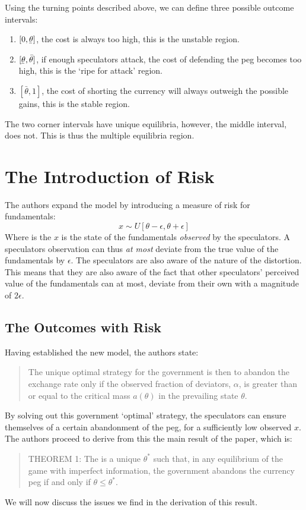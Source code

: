 \begin{refsection}
Using the turning points described above, we can define three possible outcome intervals:
\begin{enumerate}
	\item $[0, \underaccent{\bar}{\theta}]$, the cost is always too high, this is the unstable region.
	\item $[\underaccent{\bar}{\theta}, \bar{\theta}]$, if enough speculators attack, the cost of defending the peg becomes too high,
	this is the `ripe for attack' region.
	\item $[\bar{\theta}, 1]$, the cost of shorting the currency will always outweigh the possible gains,
	this is the stable region.
\end{enumerate}
The two corner intervals have unique equilibria, however, the middle interval, does not. This is thus the multiple equilibria region.


\section{The Introduction of Risk}
The authors expand the model by introducing a measure of risk for fundamentals:
\begin{equation}
x \sim U[\theta - \epsilon, \theta + \epsilon]
\end{equation}
Where is the $x$ is the state of the fundamentals \textit{observed} by the speculators.
A speculators observation can thus \textit{at most} deviate from the true value of the fundamentals by $\epsilon$.
The speculators are also aware of the nature of the distortion.
This means that they are also aware of the fact that other speculators' perceived value of the fundamentals can at most,
deviate from their own with a magnitude of $2\epsilon$.

\subsection{The Outcomes with Risk}
\label{unc:results}
Having established the new model, the authors state:
\begin{quotation}
	The unique optimal strategy for the government is then to abandon the exchange rate only if the observed fraction of deviators, $\alpha$, is greater than or equal to the critical mass $a(\theta)$ in the prevailing state $\theta$.\parencite[p.~591]{morris1998unique}
\end{quotation}
By solving out this government `optimal' strategy,
the speculators can ensure themselves of a certain abandonment of the peg,
for a sufficiently low observed $x$.
The authors proceed to derive from this the main result of the paper, which is:
\begin{quotation}
	THEOREM 1: The is a unique $\theta^*$ such that,
	in any equilibrium of the game with imperfect information,
	the government abandons the currency peg if and only if $\theta \leq \theta^*$. \parencite[p.~592]{morris1998unique}
\end{quotation}
We will now discuss the issues we find in the derivation of this result.



\end{refsection}
